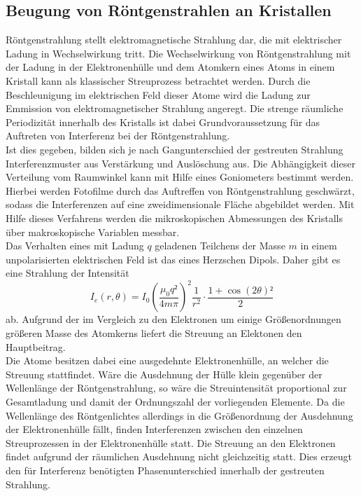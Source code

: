 \subsection{Beugung von Röntgenstrahlen an Kristallen}
%
Röntgenstrahlung stellt elektromagnetische Strahlung dar, die mit elektrischer Ladung in Wechselwirkung tritt. Die Wechselwirkung
von Röntgenstrahlung mit der Ladung in der Elektronenhülle und dem Atomkern eines Atoms in einem Kristall kann als klassischer
Streuprozess betrachtet werden. Durch die Beschleunigung im elektrischen Feld dieser Atome wird die Ladung zur Emmission von
elektromagnetischer Strahlung angeregt. Die strenge räumliche Periodizität innerhalb des Kristalls ist dabei Grundvoraussetzung
für das Auftreten von Interferenz bei der Röntgenstrahlung.\\
Ist dies gegeben, bilden sich je nach Gangunterschied der gestreuten Strahlung Interferenzmuster aus Verstärkung und Auslöschung aus.
Die Abhängigkeit dieser Verteilung vom Raumwinkel kann mit Hilfe eines Goniometers bestimmt werden. Hierbei werden
Fotofilme durch das Auftreffen von Röntgenstrahlung geschwärzt, sodass die Interferenzen auf eine zweidimensionale
Fläche abgebildet werden. Mit Hilfe dieses Verfahrens werden die mikroskopischen Abmessungen des Kristalls über
makroskopische Variablen messbar.\\
Das Verhalten eines mit Ladung $q$ geladenen Teilchens der Masse $m$ in einem unpolarisierten elektrischen Feld ist
das eines Herzschen Dipols. Daher gibt es eine Strahlung der Intensität
%
\begin{equation}
  I_e(r,\theta)=I_0\left(\frac{\mu_0q²}{4m\pi}\right)^2\frac{1}{r^2}\cdot\frac{1+\cos(2\theta)²}{2}
\end{equation}
%
ab. Aufgrund der im Vergleich zu den Elektronen um einige Größenordnungen größeren Masse des Atomkerns liefert die Streuung an
Elektonen den Hauptbeitrag.\\
Die Atome besitzen dabei eine ausgedehnte Elektronenhülle, an welcher die Streuung stattfindet. Wäre die Ausdehnung der
Hülle klein gegenüber der Wellenlänge der Röntgenstrahlung, so wäre die Streuintensität proportional zur Gesamtladung
und damit der Ordnungszahl der vorliegenden Elemente. Da die Wellenlänge des Röntgenlichtes allerdings in die Größenordnung
der Ausdehnung der Elektronenhülle fällt, finden Interferenzen zwischen den einzelnen Streuprozessen in der Elektronenhülle
statt. Die Streuung an den Elektronen findet aufgrund der räumlichen Ausdehnung nicht gleichzeitig statt. Dies erzeugt den
für Interferenz benötigten Phasenunterschied innerhalb der gestreuten Strahlung.\\
